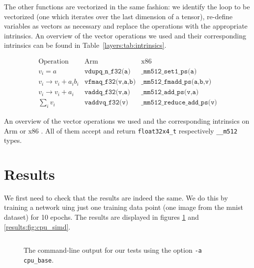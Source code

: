 \documentclass{article}
\numberwithin{equation}{section}
\numberwithin{figure}{section}
\numberwithin{table}{section}
\begin{document}
    The other functions are vectorized in the same fashion: we identify the loop to be vectorized (one which iterates over the
    last dimension of a tensor), re-define variables as vectors as necessary and replace the operations with the appropriate
    intrinsics. An overview of the vector operations we used and their corresponding intrinsics can be found in
    Table~\ref{layers:tab:intrinsics}.

    \begin{table}[htb]
        \begin{equation*}
            \begin{array}{c|c|c}
                \text{Operation} & \text{Arm} & \text{x86} \\ \hline
                v_i = a & \texttt{vdupq_n_f32(a)} & \texttt{_mm512_set1_ps(a)} \\
                v_i \rightarrow v_i + a_ib_i & \texttt{vfmaq_f32(v,a,b)} & \texttt{_mm512_fmadd_ps(a,b,v)} \\
                v_i \rightarrow v_i + a_i & \texttt{vaddq_f32(v,a)} & \texttt{_mm512_add_ps(v,a)} \\
                \sum_iv_i & \texttt{vaddvq_f32(v)} & \texttt{_mm512_reduce_add_ps(v)}
            \end{array}
        \end{equation*}
        \caption{An overview of the vector operations we used and the corresponding intrinsics on Arm or x86
        \cite{NEON:intrinsics,Intel:intrinsics}. All of them accept and return \texttt{float32x4_t} respectively
        \texttt{__m512} types.}
        \label{layers:tab:intrinsics}
    \end{table}

    \FloatBarrier
    \section{Results}
    \label{sec:results}

    We first need to check that the results are indeed the same. We do this by training a network uing just one training
    data point (one image from the mnist dataset) for \num{10} epochs. The results are displayed in
    figures \ref{results:fig:cpu_base} and \ref{results:fig:cpu_simd}.

    \begin{figure}[htb]
        \inputminted{shell-session}{21mnist/cmd_output/Arm_cpu_base.txt}
        \caption{The command-line output for our tests using the option \texttt{-a cpu_base}.}
        \label{results:fig:cpu_base}
    \end{figure}
\end{document}
